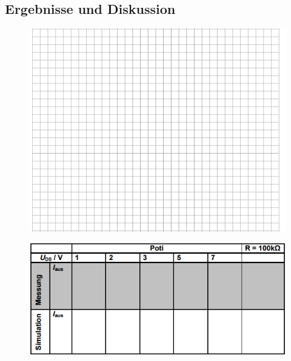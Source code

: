 \subsection{Ergebnisse und Diskussion}
\begin{figure}[!h]
\begin{center}
\includegraphics[scale=0.8]{Text}
\end{center}
\end{figure}
\begin{figure}[!h]
\begin{center}
\includegraphics[scale=0.8]{Tabelle1}
\end{center}
\end{figure}
